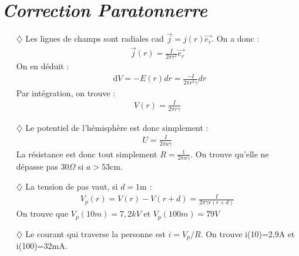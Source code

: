 \documentclass{report}
\newcommand*\dif{\mathop{}\!\mathrm{d}}
\begin{document}
\newpage


\section*{\textit{Correction Paratonnerre}}


\begin{itemize}

	\item[$\diamondsuit$] Les lignes de champs sont radiales cad $\vec{j}=j(r)\vec{e_r}$. On a donc :
\begin{align*}
	\vec{j}(r)=\frac{I}{2\pi r^2}\vec{e_r}
\end{align*}
On en déduit :
\begin{align*}
	\dif V=-E(r)dr=\frac{-I}{2\pi r^2\gamma}dr
\end{align*}
Par intégration, on trouve :
\begin{align*}
	V(r)=\frac{I}{2\pi r\gamma}
\end{align*}

	\item[$\diamondsuit$] Le potentiel de l'hémisphère est donc simplement :
\begin{align*}
	U=\frac{I}{2\pi a\gamma}
\end{align*}
La résistance est donc tout simplement $R=\frac{1}{2\pi a \gamma}$. On trouve qu'elle ne dépasse pas 30$\Omega$ si $a>53$cm.

	\item[$\diamondsuit$] La tension de pas vaut, si $d=1$m :
	\begin{align*}
		V_p(r)=V(r)-V(r+d)=\frac{I}{2\pi \gamma r(r+d)}
	\end{align*}
On trouve que $V_p(10m)=7,2kV$ et  $V_p(100m)=79V$

	\item[$\diamondsuit$] Le courant qui traverse la personne est $i=V_p/R$. On trouve i(10)=2,9A et i(100)=32mA.
\end{itemize}
\end{document}
